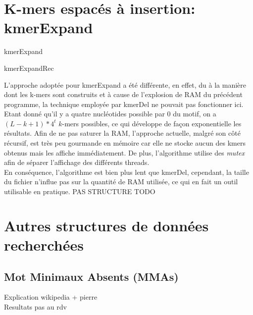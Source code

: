 \documentclass{report}
\begin{document}
  \chapter{K-mers espacés à insertion: kmerExpand}
    \normalsize
    \begin{algorithm}[H]{
      \caption{kmerExpand}
    }\end{algorithm}
    \begin{algorithm}[H]{
      \caption{kmerExpandRec}
    }\end{algorithm}\bigskip
    \large
    L'approche adoptée pour kmerExpand a été différente, en effet, du à la manière dont les k-mers sont construits et à cause de l'explosion de RAM du précédent programme, la technique employée par kmerDel ne pouvait pas fonctionner ici.\\
    Etant donné qu'il y a quatre nucléotides possible par $0$ du motif, on a $(L - k + 1 )*4^t$ $k$-mers possibles, ce qui développe de façon exponentielle les résultats. Afin de ne pas saturer la RAM, l'approche actuelle, malgré son côté récursif, est très peu gourmande en mémoire car elle ne stocke aucun des kmers obtenus mais les affiche immédiatement. De plus, l'algorithme utilise des \textit{mutex} afin de séparer l'affichage des différents threads.\\
    En conséquence, l'algorithme est bien plus lent que kmerDel, cependant, la taille du fichier n'influe pas sur la quantité de RAM utilisée, ce qui en fait un outil utilisable en pratique.
    \newpage
    PAS STRUCTURE TODO
  \chapter{Autres structures de données recherchées}
    \section{Mot Minimaux Absents (MMAs)}
      Explication wikipedia + pierre\\
      Resultats pas au rdv
\end{document}
